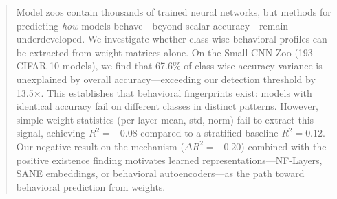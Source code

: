 \begin{abstract}
Model zoos contain thousands of trained neural networks, but methods for predicting \emph{how} models behave---beyond scalar accuracy---remain underdeveloped. We investigate whether class-wise behavioral profiles can be extracted from weight matrices alone. On the Small CNN Zoo (193 CIFAR-10 models), we find that 67.6\% of class-wise accuracy variance is unexplained by overall accuracy---exceeding our detection threshold by 13.5$\times$. This establishes that behavioral fingerprints exist: models with identical accuracy fail on different classes in distinct patterns. However, simple weight statistics (per-layer mean, std, norm) fail to extract this signal, achieving $R^2 = -0.08$ compared to a stratified baseline $R^2 = 0.12$. Our negative result on the mechanism ($\Delta R^2 = -0.20$) combined with the positive existence finding motivates learned representations---NF-Layers, SANE embeddings, or behavioral autoencoders---as the path toward behavioral prediction from weights.
\end{abstract}
